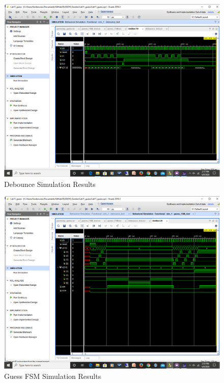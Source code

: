 \documentclass[11pt]{article}
\begin{document}
\begin{figure}[ht]\centering
	\includegraphics[width=1.15\textwidth, trim=7.5cm 14cm 0cm 4cm,clip]{debounce.png}
	\caption{Debounce Simulation Results}
	\label{fig:sim_with_table}
\end{figure}


\begin{figure}[ht]\centering
	\includegraphics[width=1.15\textwidth, trim=7.5cm 10cm 0cm 4.0cm,clip]{guess_FSM.png}
	\caption{Guess FSM Simulation Results}
	\label{fig:sim_with_table}
\end{figure}
\end{document}
